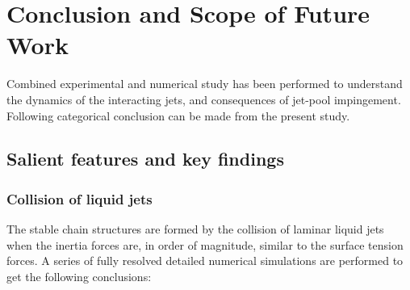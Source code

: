 \chapter{Conclusion and Scope of Future Work}
Combined experimental and numerical study has been performed to understand the dynamics of the interacting jets, and consequences of jet-pool impingement. Following categorical conclusion can be made from the present study.  
\section{Salient features and key findings}
\subsection{Collision of liquid jets}
The stable chain structures are formed by the collision of laminar liquid jets when the inertia forces are, in order of magnitude, similar to the surface tension forces. A series of fully resolved detailed numerical simulations are performed to get the following conclusions:
